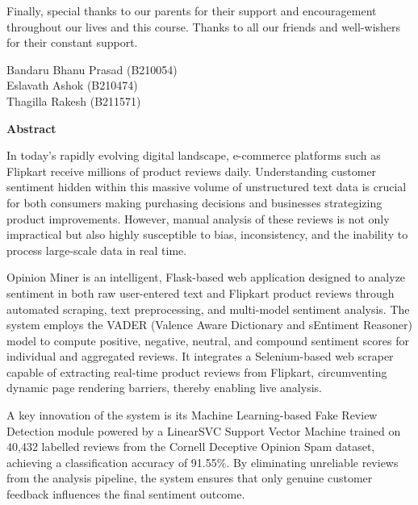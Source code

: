 \documentclass[12pt,a4paper]{report}
\begin{document}
\medskip
\noindent\hspace{1cm} Finally, special thanks to our parents for their support and encouragement throughout our lives and this course. Thanks to all our friends and well-wishers for their constant support.

\vspace{1.5cm}
\begin{flushright}
Bandaru Bhanu Prasad (B210054)\\
Eslavath Ashok (B210474)\\
Thagilla Rakesh (B211571)
\end{flushright}

\newpage
\setcounter{page}{6}
\thispagestyle{fancy}

\begin{center}
{\large\textbf{Abstract}}
\end{center}

\medskip
\noindent\hspace{1cm} In today's rapidly evolving digital landscape, e-commerce platforms such as Flipkart receive millions of product reviews daily. Understanding customer sentiment hidden within this massive volume of unstructured text data is crucial for both consumers making purchasing decisions and businesses strategizing product improvements. However, manual analysis of these reviews is not only impractical but also highly susceptible to bias, inconsistency, and the inability to process large-scale data in real time.

\medskip
\noindent\hspace{1cm} Opinion Miner is an intelligent, Flask-based web application designed to analyze sentiment in both raw user-entered text and Flipkart product reviews through automated scraping, text preprocessing, and multi-model sentiment analysis. The system employs the VADER (Valence Aware Dictionary and sEntiment Reasoner) model to compute positive, negative, neutral, and compound sentiment scores for individual and aggregated reviews. It integrates a Selenium-based web scraper capable of extracting real-time product reviews from Flipkart, circumventing dynamic page rendering barriers, thereby enabling live analysis.

\medskip
\noindent\hspace{1cm} A key innovation of the system is its Machine Learning-based Fake Review Detection module powered by a LinearSVC Support Vector Machine trained on 40,432 labelled reviews from the Cornell Deceptive Opinion Spam dataset, achieving a classification accuracy of 91.55\%. By eliminating unreliable reviews from the analysis pipeline, the system ensures that only genuine customer feedback influences the final sentiment outcome.
\end{document}
